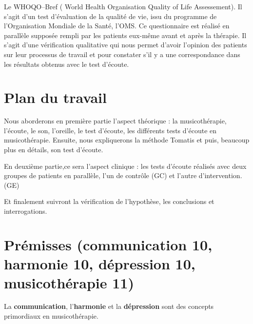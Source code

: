 	
	
        
   Le WHOQO--Bref ( World Health
   Organisation Quality of Life Assessement). Il s'agit d'un test d'évaluation de la qualité de vie, issu du
	programme de l'Organisation Mondiale de la Santé, l'OMS.
	Ce questionnaire est réalisé en parallèle supposée rempli par les patients eux-même  avant et après la thérapie.
	Il s'agit d'une vérification qualitative qui nous permet
        d'avoir l'opinion des patients sur leur processus de travail
        et  pour constater s'il y a une correspondance dans 
        les résultats obtenus avec le test d'écoute. 
	
	
	 


\section*{Plan du travail}


Nous aborderons en première partie l'aspect théorique : la musicothérapie, l'écoute, le son, l'oreille, le 
test d'écoute, les différents tests d'écoute en musicothérapie.  Ensuite, nous 
expliquerons  la méthode Tomatis
et puis, beaucoup plus en détails, son test d'écoute.
 
En deuxième partie,ce sera l'aspect clinique : les tests d'écoute réalisés  avec deux groupes 
de patients en parallèle, l'un de contrôle (GC) et l'autre d'intervention.(GE)

Et finalement suivront la vérification de l'hypothèse, les conclusions et 
interrogations. 





\section{Prémisses (communication 10, harmonie 10, dépression 10,
  musicothérapie 11)}





La \textbf{communication}, l'\textbf{harmonie} et la \textbf{ dépression}
sont des concepts primordiaux en
musicothérapie.


